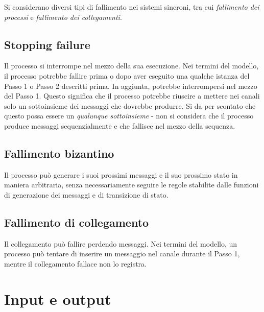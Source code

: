 \documentclass[italian,]{book}
\begin{document}
Si considerano diversi tipi di fallimento nei sistemi sincroni, tra cui
\emph{fallimento dei processi} e \emph{fallimento dei collegamenti}.

\hypertarget{stopping-failure}{%
\subsection*{Stopping failure}\label{stopping-failure}}

Il processo si interrompe nel mezzo della sua esecuzione. Nei termini
del modello, il processo potrebbe fallire prima o dopo aver eseguito una
qualche istanza del Passo 1 o Passo 2 descritti prima. In aggiunta,
potrebbe interrompersi nel mezzo del Passo 1. Questo significa che il
processo potrebbe riuscire a mettere nei canali solo un sottoinsieme dei
messaggi che dovrebbe produrre. Si da per scontato che questo possa
essere un \emph{qualunque sottoinsieme} - non si considera che il
processo produce messaggi sequenzialmente e che fallisce nel mezzo della
sequenza.

\hypertarget{fallimento-bizantino}{%
\subsection*{Fallimento bizantino}\label{fallimento-bizantino}}

Il processo può generare i suoi prossimi messaggi e il suo prossimo
stato in maniera arbitraria, senza necessariamente seguire le regole
stabilite dalle funzioni di generazione dei messaggi e di transizione di
stato.

\hypertarget{fallimento-di-collegamento}{%
\subsection*{Fallimento di
collegamento}\label{fallimento-di-collegamento}}

Il collegamento può fallire perdendo messaggi. Nei termini del modello,
un processo può tentare di inserire un messaggio nel canale durante il
Passo 1, mentre il collegamento fallace non lo registra.

\hypertarget{input-e-output}{%
\section{Input e output}\label{input-e-output}}
\end{document}
